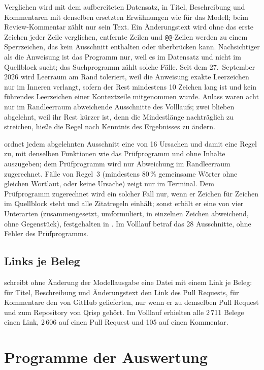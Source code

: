 \documentclass[11pt,a4paper]{report}
\begin{document}
Verglichen wird mit dem aufbereiteten Datensatz, in Titel, Beschreibung
und Kommentaren mit denselben ersetzten Erwähnungen wie für das Modell;
beim Review-Kommentar zählt nur sein Text. Ein Änderungstext wird ohne
das erste Zeichen jeder Zeile verglichen, entfernte Zeilen und
\texttt{@@}-Zeilen werden zu einem Sperrzeichen, das kein Ausschnitt
enthalten oder überbrücken kann. Nachsichtiger als die Anweisung ist das
Programm nur, weil es im Datensatz und nicht im Quellblock sucht; das
Suchprogramm zählt solche Fälle. Seit dem 27.~September 2026 wird
Leerraum am Rand toleriert, weil die Anweisung exakte Leerzeichen nur im
Inneren verlangt, sofern der Rest mindestens 10 Zeichen lang ist und
kein führendes Leerzeichen einer Kontextzeile mitgenommen wurde. Anlass
waren acht nur im Randleerraum abweichende Ausschnitte des Volllaufs;
zwei blieben abgelehnt, weil ihr Rest kürzer ist, denn die Mindestlänge
nachträglich zu streichen, hieße die Regel nach Kenntnis des Ergebnisses
zu ändern.

 ordnet jedem abgelehnten
Ausschnitt eine von 16 Ursachen und damit eine Regel zu, mit denselben
Funktionen wie das Prüfprogramm und ohne Inhalte auszugeben; dem
Prüfprogramm wird nur Abweichung im Randleerraum zugerechnet. Fälle von
Regel~3 (mindestens 80\,\% gemeinsame Wörter ohne gleichen Wortlaut,
oder keine Ursache) zeigt  nur im Terminal.
Dem Prüfprogramm zugerechnet wird ein solcher Fall nur, wenn er Zeichen
für Zeichen im Quellblock steht und alle Zitatregeln einhält; sonst
erhält er eine von vier Unterarten (zusammengesetzt, umformuliert, in
einzelnen Zeichen abweichend, ohne Gegenstück), festgehalten in
. Im Volllauf betraf das 28 Ausschnitte,
ohne Fehler des Prüfprogramms.

\subsection{Links je Beleg}
\label{subsec:impl-links}

 schreibt ohne Änderung der Modellausgabe
eine Datei mit einem Link je Beleg: für Titel, Beschreibung und
Änderungstext den Link des Pull Requests, für Kommentare den von GitHub
gelieferten, nur wenn er zu demselben Pull Request und zum Repository
von Qrisp gehört. Im Volllauf erhielten alle 2\,711 Belege einen Link,
2\,606 auf einen Pull Request und 105 auf einen Kommentar.

\section{Programme der Auswertung}
\label{sec:impl-auswertung}
\label{subsec:impl-ziehung}
\label{subsec:impl-zaehlung}
\label{subsec:impl-pruefboegen}
\label{subsec:impl-bewertung}
\end{document}
